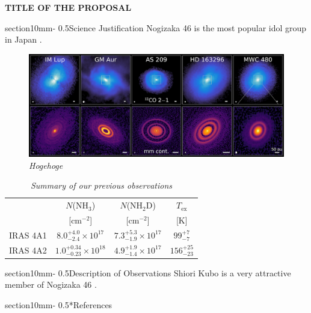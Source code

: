 \documentclass[letterpaper,11pt,twocolumn]{article}
\makeatletter
\renewcommand{\section}{\@startsection%
{section}{1}{0mm}{-\baselineskip}%
{0.5\baselineskip}{\normalfont\Large\bfseries}}%
\makeatother
\begin{document}
\pagestyle{plain}


\begin{center} 
\bfseries\uppercase{%
Title of the proposal
}
\end{center}



\section{Science Justification}
Nogizaka 46 is the most popular idol group in Japan \citep{Yamato22}.

\begin{figure}[h]
    \centering
    \includegraphics[width=\hsize]{MAPS_disks.png}
    \caption{\em{Hogehoge}}
    \label{fig:MAPS_disks}
\end{figure}


\begin{table}[h]
    \centering
    \caption{\em{Summary of our previous observations}}
    \label{tab:transitions}
    \begin{tabular}{cccc}\hline
         & $N$(NH$_3$) & $N$(NH$_2$D) & $T_\mathrm{ex}$  \\
                   & [cm$^{-2}$] & [cm$^{-2}$]  & [K]  \\
        \hline
    IRAS 4A1 & $8.0^{+4.0}_{-2.4}\times 10^{17}$ & $7.3^{+5.3}_{-1.9}\times 10^{17}$ & $99^{+7}_{-7}$ \\
    IRAS 4A2 & $1.0^{+0.34}_{-0.23}\times 10^{18}$ & $4.9^{+1.9}_{-1.4}\times 10^{17}$ & $156^{+25}_{-23}$ \\
    \hline
    \end{tabular}
\end{table}


\section{Description of Observations}
Shiori Kubo is a very attractive member of Nogizaka 46 \citep{Yamato22}.




\section*{References}




\end{document}
